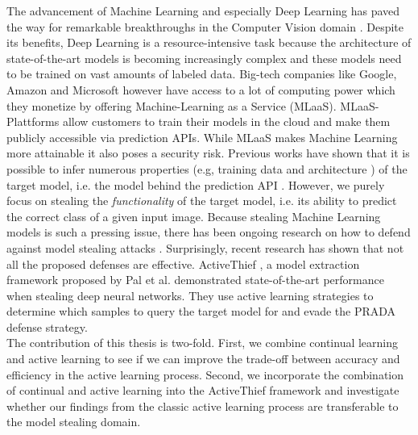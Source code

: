 
\Abstract
The advancement of Machine Learning and especially Deep Learning has paved the way for remarkable breakthroughs in the Computer Vision domain \cite{he2016deep}
 \cite{goodfellow2020generative} \cite{lecun1989backpropagation}. Despite its benefits, Deep Learning is a resource-intensive task because the architecture
  of state-of-the-art models is becoming increasingly complex and these models need to be trained on vast amounts of labeled data. Big-tech companies like Google,
 Amazon and Microsoft however have access to a lot of computing power which they monetize by offering Machine-Learning as a Service (MLaaS). MLaaS-Plattforms
allow customers to train their models in the cloud and make them publicly accessible via prediction APIs. While MLaaS makes Machine Learning more attainable
 it also poses a security risk. Previous works have shown that it is possible to infer numerous properties (e.g, training data \cite{shokri2017membership}
and architecture \cite{oh2019towards}) of the target model, i.e. the model behind the prediction API \cite{tramer2016stealing} \cite{papernot2017practical}.
However, we purely focus on stealing the \textit{functionality} of the target model, i.e. its ability to predict the correct class of a given input image.
Because stealing Machine Learning models is such a pressing issue, there has been ongoing research on how to defend against model stealing attacks
\cite{orekondy2019prediction} \cite{juuti2019prada}. Surprisingly, recent research has shown that not all the proposed defenses are effective.
ActiveThief \cite{pal2020activethief}, a model extraction framework proposed by Pal et al. demonstrated state-of-the-art performance when stealing deep neural
networks. They use active learning strategies to determine which samples to query the target model for and evade the PRADA \cite{juuti2019prada} defense strategy. \\
The contribution of this thesis is two-fold. First, we combine continual learning and active learning to see if we can improve the trade-off between accuracy and 
efficiency in the active learning process. Second, we incorporate the combination of continual and active learning into the ActiveThief framework and investigate
whether our findings from the classic active learning process are transferable to the model stealing domain.
